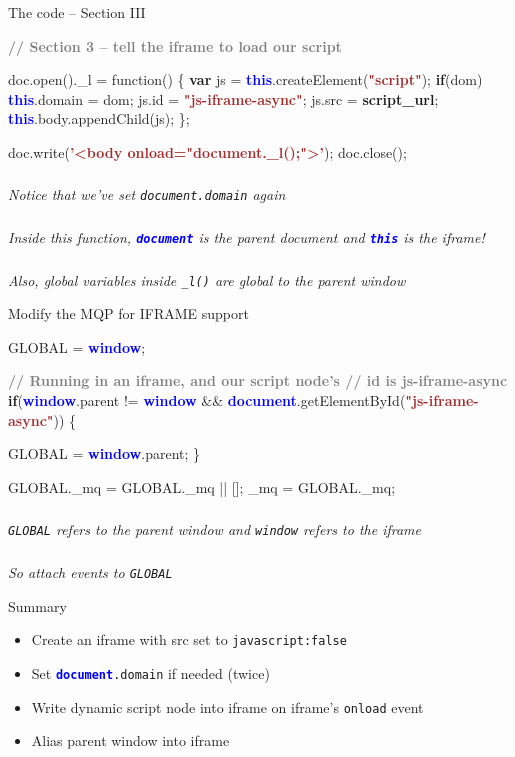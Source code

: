 \documentclass{beamer}
\newcommand{\innersplash}[1]{
  \begin{center}
    \Large \textrm{\textit{ #1 } }
  \end{center}
}
\newcommand{\splashslide}[2][{}]{
  \begin{frame}
  \frametitle{#1}
  \innersplash{#2}
  \end{frame}
}
\def\gray<#1>#2{\textcolor<#1>{gray}{\textbf<#1>{#2}}}
\def\brown<#1>#2{\textcolor<#1>{brown}{\textbf<#1>{#2}}}
\def\green<#1>#2{\textcolor<#1>{dark-green}{\textbf<#1>{#2}}}
\def\blue<#1>#2{\textcolor<#1>{blue}{\textbf<#1>{#2}}}
\begin{document}
\begin{frame}[fragile]{The code -- Section III}
\begin{semiverbatim}
\gray<1>{// Section 3 -- tell the iframe to load our script}

doc.open().\_l = function() \{
    \green<1>{var} js = \blue<1>{this}.createElement(\brown<1>{"script"});
    \green<1>{if}(dom)
        \blue<1>{this}.domain = dom;
    js.id = \brown<1>{"js-iframe-async"};
    js.src = \textbf{script\_url};
    \blue<1>{this}.body.appendChild(js);
\};

doc.write(\brown<1>{'<body onload="document.\_l();">'});
doc.close();
\end{semiverbatim}
\end{frame}

\splashslide{Notice that we've set \texttt{document.domain} again}

\splashslide{Inside this function, \blue<1>{\texttt{document}} is the parent document and \blue<1>{\texttt{this}} is the iframe!}

\splashslide{Also, global variables inside \texttt{\_l()} are global to the parent window}

\begin{frame}[fragile]{Modify the MQP for IFRAME support}
\begin{semiverbatim}
GLOBAL = \blue<1>{window};

\gray<1>{// Running in an iframe, and our script node's
// id is js-iframe-async}
\green<1>{if}(\blue<1>{window}.parent != \blue<1>{window} &&
   \blue<1>{document}.getElementById(\brown<1>{"js-iframe-async"})) \{

    GLOBAL = \blue<1>{window}.parent;
\}

GLOBAL.\_mq = GLOBAL.\_mq || [];
\_mq = GLOBAL.\_mq;
\end{semiverbatim}
\end{frame}

\splashslide{\texttt{GLOBAL} refers to the parent window and \texttt{window} refers to the iframe}

\splashslide{So attach events to \texttt{GLOBAL}}

\begin{frame}{Summary}
\begin{itemize}
  \item Create an iframe with src set to \texttt{javascript:false}
  \item Set \texttt{\blue<1>{document}.domain} if needed (twice)
  \item Write dynamic script node into iframe on iframe's \texttt{onload} event
  \item Alias parent window into iframe
\end{itemize}
\end{frame}
\end{document}
